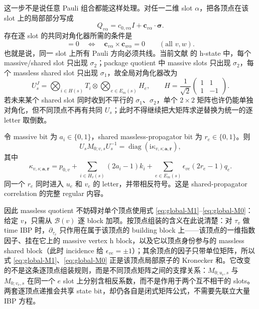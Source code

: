 \documentclass[11pt,a4paper]{ctexart}
\newcommand{\ii}{\mathrm i}
\newcommand{\cB}{\mathcal B}
\begin{document}
这一步不是说任意 Pauli 组合都能这样处理。对任一二维 slot $\alpha$，把各顶点在该 slot 上的局部部分写成
\begin{equation}
 Q_{v\alpha}=c_{0,v\alpha}I+\bm c_{v\alpha}\cdot\bm\sigma.
\end{equation}
存在逐 slot 的共同对角化器所需的条件是
\begin{equation}
 [Q_{v\alpha},Q_{w\alpha}]=0
 \quad\Longleftrightarrow\quad
 \bm c_{v\alpha}\times\bm c_{w\alpha}=0
 \qquad(\text{all }v,w).
 \label{eq:local-common-diagonalization-condition}
\end{equation}
也就是说，同一 slot 上所有 Pauli 方向必须共线。当前文献 \cite{Chen:2023eic} 的 h-state 中，每个 massive/shared slot 只出现 $\sigma_2$；package quotient 中 massive slots 只出现 $\sigma_2$，每个 massless shared slot 只出现 $\sigma_1$，故全局对角化器改为
\begin{equation}
 U_s^J
 =\bigotimes_{i\in H(s)}T_i
 \otimes\bigotimes_{e\in E_m(s)}H_e,
 \qquad
 H=\frac1{\sqrt2}\begin{pmatrix}1&1\\1&-1\end{pmatrix}.
 \label{eq:package-global-diagonalizer}
\end{equation}
若未来某个 shared slot 同时收到不平行的 $\sigma_1$、$\sigma_2$，单个 $2\times2$ 矩阵也许仍能单独对角化，但不同顶点不再有共同 $U_s$；此时不得继续把大矩阵求逆替换为统一的逐 letter 取倒数。

令 massive bit 为 $a_i\in\{0,1\}$，shared massless-propagator bit 为 $r_e\in\{0,1\}$。则
\begin{equation}
 U_sM_{0;v,s}U_s^{-1}
 =\operatorname{diag}\!\left(\ii\kappa_{v,s;\bm a,\bm r}\right),
 \label{eq:global-M0-diagonal}
\end{equation}
其中
\begin{equation}
 \boxed{
 \kappa_{v,s;\bm a,\bm r}
 =p_{0,v}
 +\sum_{i\in H_v(s)}(2a_i-1)k_i
 +\sum_{e\in E_m(s)}
 \epsilon_{ve}(2r_e-1)q_e.
 }
 \label{eq:global-energy-letter}
\end{equation}
同一个 $r_e$ 同时进入 $u_e$ 和 $v_e$ 的 letter，并带相反符号。这是 shared-propagator correlation 的完整 regular 内容。

因此 massless quotient 不妨碍对单个顶点使用式 \eqref{eq:global-M1}--\eqref{eq:global-M0}：给定 $v$，只需从 $\cB(v)$ 逐 block 加项。按顶点组装的含义在此说清楚：对 $\tau_v$ 做 time IBP 时，$\partial_{\tau_v}$ 只作用在属于该顶点的 building block 上——该顶点的一维指数因子、挂在它上的 massive vertex h block，以及它以顶点身份参与的 massless shared block（此时 incidence 给 $\epsilon_{ve}=\pm1$）；其余顶点的因子只带单位矩阵，所以式 \eqref{eq:global-M1}、\eqref{eq:global-M0} 正是该顶点局部原子的 Kronecker 和。它改变的不是这条逐顶点组装规则，而是不同顶点矩阵之间的支撑关系：$M_{0;u_e,s}$ 与 $M_{0;v_e,s}$ 在同一个 $e$ slot 上分别含相反系数，而不是作用于两个互不相干的 slots。两套逐顶点递推会共享 state bit，却仍各自是闭式矩阵公式，不需要先联立大量 IBP 方程。
\end{document}
